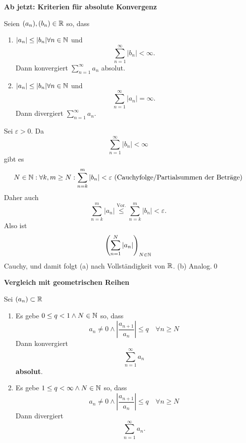 \textbf{Ab jetzt: Kriterien für absolute Konvergenz}
\begin{subproposition}
	Seien $ (a_n), (b_n) \in \mathbb{R} $ so, dass
	\begin{enumerate}[label=(\alph*)]
		\item $ | a_n | \leq | b_n | \forall n \in \mathbb{N} $ und
			\[ \sum_{ n = 1 }^{\infty} | b_n | < \infty. \]
			Dann konvergiert $ \sum_{n = 1}^{\infty} a_n $ absolut.
		\item $ | a_n | \leq | b_n | \forall n \in \mathbb{N} $ und
			\[ \sum_{ n = 1 }^{\infty} | a_n | = \infty. \]
			Dann divergiert $ \sum_{n = 1}^{\infty} a_n $.
	\end{enumerate}
\end{subproposition}

\begin{subproof*}
	Sei $ \varepsilon > 0 $. Da
	\[ \sum_{n = 1 }^{\infty} |b_n | < \infty \]
	gibt es
	\[ N \in \mathbb{N} : \forall k, m \geq N : \sum_{n=k}^{m} |b_n| < \varepsilon \text{ (Cauchyfolge/Partialsummen der Beträge)} \]
	Daher auch
	\[ \sum_{n=k}^{m} |a_n| \overset{\text{Vor.}}{\leq} \sum_{n=k}^{m} | b_n| < \varepsilon. \]
	Also ist 
	\[ \left ( \sum_{n = 1}^{N} |a_n| \right)_{N\in \mathbb{N}} \]
	Cauchy, und damit folgt (a) nach Vollständigkeit von $ \mathbb{R} $. (b) Analog.\qed
\end{subproof*}
{\color{yellow}\textbf{Vergleich mit geometrischen Reihen}}
\begin{subproposition}[(Quotientenkriterium)]
	Sei $ (a_n) \subset \mathbb{R} $
	\begin{enumerate}[label=(\alph*)]
		\item Es gebe $ 0 \leq q < 1 \wedge N \in \mathbb{N} $ so, dass
			\[ a_n \neq 0 \wedge \left | \frac{a_{n + 1}}{a_n} \right | \leq q \quad \forall n \geq N \]
			Dann konvergiert
			\[ \sum_{n=1}^{\infty} a_n \]
			\textbf{absolut}.

		\item Es gebe $ 1 \leq q < \infty \wedge N \in \mathbb{N} $ so, dass
			\[ a_n \neq 0 \wedge \left | \frac{a_{n + 1}}{a_n} \right | \leq q \quad \forall n \geq N \]
			Dann divergiert
			\[ \sum_{n=1}^{\infty} a_n. \]
	\end{enumerate}
\end{subproposition}

